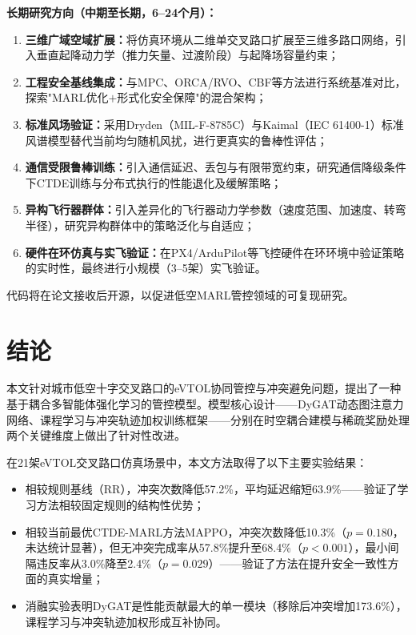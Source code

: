 \documentclass[12pt,a4paper,UTF8]{ctexart}
\begin{document}
\textbf{长期研究方向（中期至长期，6--24个月）：}
\begin{enumerate}[label=(\arabic*)]
    \item \textbf{三维广域空域扩展：}将仿真环境从二维单交叉路口扩展至三维多路口网络，引入垂直起降动力学（推力矢量、过渡阶段）与起降场容量约束；
    \item \textbf{工程安全基线集成：}与MPC、ORCA/RVO、CBF等方法进行系统基准对比，探索"MARL优化$+$形式化安全保障"的混合架构；
    \item \textbf{标准风场验证：}采用Dryden（MIL-F-8785C）与Kaimal（IEC 61400-1）标准风谱模型替代当前均匀随机风扰，进行更真实的鲁棒性评估；
    \item \textbf{通信受限鲁棒训练：}引入通信延迟、丢包与有限带宽约束，研究通信降级条件下CTDE训练与分布式执行的性能退化及缓解策略；
    \item \textbf{异构飞行器群体：}引入差异化的飞行器动力学参数（速度范围、加速度、转弯半径），研究异构群体中的策略泛化与自适应；
    \item \textbf{硬件在环仿真与实飞验证：}在PX4/ArduPilot等飞控硬件在环环境中验证策略的实时性，最终进行小规模（3--5架）实飞验证。
\end{enumerate}

代码将在论文接收后开源，以促进低空MARL管控领域的可复现研究。

\section{结论}

本文针对城市低空十字交叉路口的eVTOL协同管控与冲突避免问题，提出了一种基于耦合多智能体强化学习的管控模型。模型核心设计——DyGAT动态图注意力网络、课程学习与冲突轨迹加权训练框架——分别在时空耦合建模与稀疏奖励处理两个关键维度上做出了针对性改进。

在21架eVTOL交叉路口仿真场景中，本文方法取得了以下主要实验结果：
\begin{itemize}
    \item 相较规则基线（RR），冲突次数降低57.2\%，平均延迟缩短63.9\%——验证了学习方法相较固定规则的结构性优势；
    \item 相较当前最优CTDE-MARL方法MAPPO，冲突次数降低10.3\%（$p=0.180$，未达统计显著），但无冲突完成率从57.8\%提升至68.4\%（$p<0.001$），最小间隔违反率从3.0\%降至2.4\%（$p=0.029$）——验证了方法在提升安全一致性方面的真实增量；
    \item 消融实验表明DyGAT是性能贡献最大的单一模块（移除后冲突增加173.6\%），课程学习与冲突轨迹加权形成互补协同。
\end{itemize}
\end{document}
